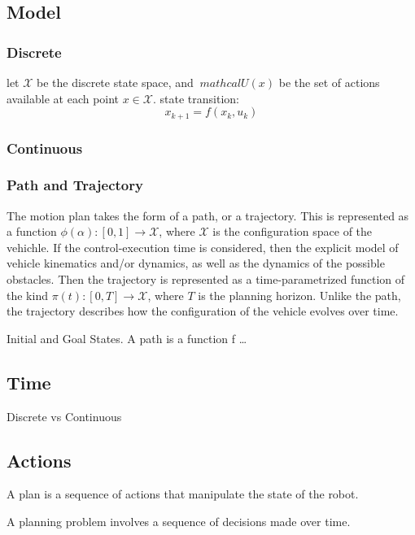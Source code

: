 \subsection{Model}

\subsubsection{Discrete}
let \(\mathcal{X}\) be the discrete state space, and \(\ mathcal{U}(x)\) be
the set of actions available at each point \(x \in \mathcal{X}\).
state transition:
\[
  x_{k+1} = f(x_k, u_k)
\]

\subsubsection{Continuous}

\subsubsection{Path and Trajectory}

The motion plan takes the form of a path, or a trajectory. This is represented
as a function \(\phi(\alpha) \colon [0,1] \rightarrow \mathcal{X}\), where
\(\mathcal{X}\) is the configuration space of the vehichle. If the
control-execution time is considered, then the explicit model of vehicle
kinematics and/or dynamics, as well as the dynamics of the possible obstacles.
Then the trajectory is represented as a time-parametrized function of the kind
\(\pi(t) \colon [0,T] \rightarrow \mathcal{X}\), where \(T\) is the planning
horizon. Unlike the path, the trajectory describes how the configuration of the
vehicle evolves over time.

Initial and Goal States. A path is a function f \ldots

\subsection{Time}
\label{subsec:Time}

Discrete vs Continuous

\subsection{Actions}
\label{subsec:Actions}

A plan is a sequence of actions that manipulate the state of the robot.

A planning problem involves a sequence of decisions made over time.


